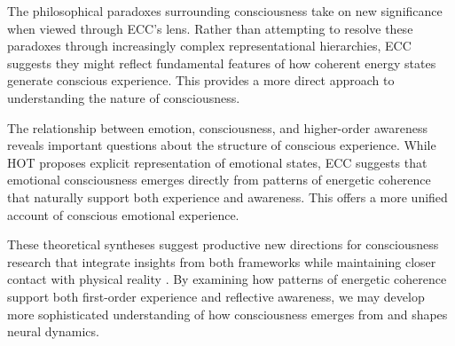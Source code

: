 The philosophical paradoxes surrounding consciousness \cite{Gennaro2012} take on new significance when viewed through ECC's lens. Rather than attempting to resolve these paradoxes through increasingly complex representational hierarchies, ECC suggests they might reflect fundamental features of how coherent energy states generate conscious experience. This provides a more direct approach to understanding the nature of consciousness.

The relationship between emotion, consciousness, and higher-order awareness \cite{LeDoux2017} reveals important questions about the structure of conscious experience. While HOT proposes explicit representation of emotional states, ECC suggests that emotional consciousness emerges directly from patterns of energetic coherence that naturally support both experience and awareness. This offers a more unified account of conscious emotional experience.

These theoretical syntheses suggest productive new directions for consciousness research that integrate insights from both frameworks while maintaining closer contact with physical reality \cite{Rosenthal2019}. By examining how patterns of energetic coherence support both first-order experience and reflective awareness, we may develop more sophisticated understanding of how consciousness emerges from and shapes neural dynamics.